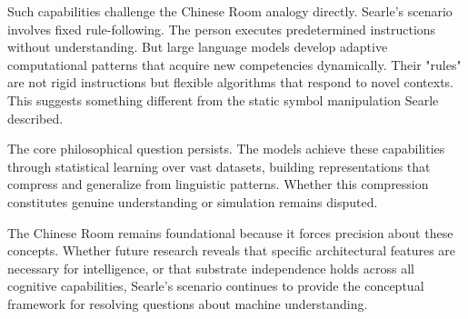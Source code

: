 Such capabilities challenge the Chinese Room analogy directly. Searle's scenario involves fixed rule-following. The person executes predetermined instructions without understanding. But large language models develop adaptive computational patterns that acquire new competencies dynamically. Their "rules" are not rigid instructions but flexible algorithms that respond to novel contexts. This suggests something different from the static symbol manipulation Searle described.

The core philosophical question persists. The models achieve these capabilities through statistical learning over vast datasets, building representations that compress and generalize from linguistic patterns. Whether this compression constitutes genuine understanding or simulation remains disputed.

The Chinese Room remains foundational because it forces precision about these concepts. Whether future research reveals that specific architectural features are necessary for intelligence, or that substrate independence holds across all cognitive capabilities, Searle's scenario continues to provide the conceptual framework for resolving questions about machine understanding.

\clearpage

